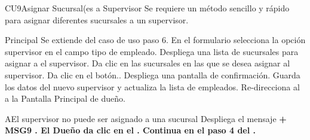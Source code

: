 \begin{UseCase}{CU9}{Asignar Sucursal(es} a Supervisor{
		Se requiere un método sencillo y rápido para asignar diferentes sucursales a un supervisor.
	}
	\end{UseCase}
	\begin{UCtrayectoria}{Principal}
		\UCpaso Se extiende del caso de uso  paso 6.
		\UCpaso[\UCactor] En el formulario selecciona la opción supervisor en el campo tipo de empleado.
		\UCpaso Despliega una lista de sucursales para asignar a el supervisor.
		\UCpaso [\UCactor] Da clic en las sucursales en las que se desea asignar al supervisor.
		\UCpaso [\UCactor] Da clic en el botón..
		\UCpaso Despliega una pantalla de confirmación. 
		\UCpaso Guarda los datos del nuevo supervisor y actualiza la lista de empleados.
		\UCpaso Re-direcciona al \UCactor a la  {Pantalla Principal de dueño}.
	
	\end{UCtrayectoria}


		\begin{UCtrayectoriaA}{A}{El supervisor no puede ser asignado a una sucursal}
			\UCpaso Despliega el mensaje \bf {+ MSG9 }  .
			\UCpaso[\UCactor] El Dueño da clic en el .
			\UCpaso Continua en el paso 4 del .
		\end{UCtrayectoriaA}

